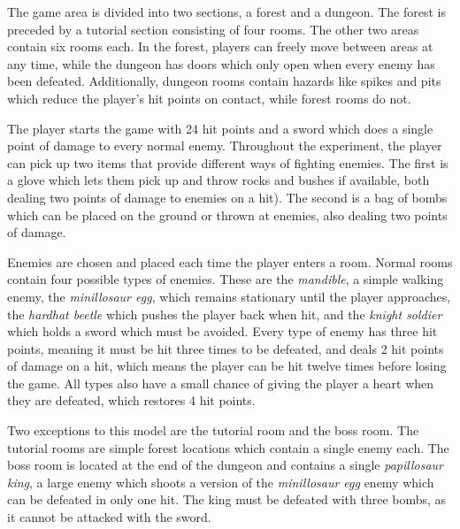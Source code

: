 \documentclass[a4paper]{article}
\begin{document}
\begin{multicols*}{2}
The game area is divided into two sections, a forest and a dungeon. The forest is preceded by a tutorial section consisting of four rooms. The other two areas contain six rooms each. In the forest, players can freely move between areas at any time, while the dungeon has doors which only open when every enemy has been defeated. Additionally, dungeon rooms contain hazards like spikes and pits which reduce the player's hit points on contact, while forest rooms do not.

The player starts the game with 24 hit points and a sword which does a single point of damage to every normal enemy. Throughout the experiment, the player can pick up two items that provide different ways of fighting enemies. The first is a glove which lets them pick up and throw rocks and bushes if available, both dealing two points of damage to enemies on a hit). The second is a bag of bombs which can be placed on the ground or thrown at enemies, also dealing two points of damage. 

Enemies are chosen and placed each time the player enters a room. Normal rooms contain four possible types of enemies. These are the \emph{mandible}, a simple walking enemy, the \emph{minillosaur egg}, which remains stationary until the player approaches, the \emph{hardhat beetle} which pushes the player back when hit, and the \emph{knight soldier} which holds a sword which must be avoided. Every type of enemy has three hit points, meaning it must be hit three times to be defeated, and deals 2 hit points of damage on a hit, which means the player can be hit twelve times before losing the game. All types also have a small chance of giving the player a heart when they are defeated, which restores 4 hit points.

Two exceptions to this model are the tutorial room and the boss room. The tutorial rooms are simple forest locations which contain a single enemy each. The boss room is located at the end of the dungeon and contains a single \emph{papillosaur king}, a large enemy which shoots a version of the \emph{minillosaur egg} enemy which can be defeated in only one hit. The king must be defeated with three bombs, as it cannot be attacked with the sword.


\end{multicols*}
\end{document}
